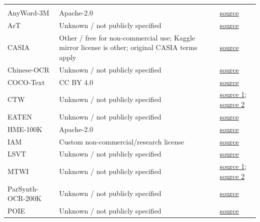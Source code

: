 \begin{longtable}{@{}>{\raggedright\arraybackslash}p{}>{\raggedright\arraybackslash}p{}>{\raggedright\arraybackslash}p{}@{}}
\midrule
{} \\
AnyWord-3M & Apache-2.0 & \href{https://huggingface.co/datasets/stzhao/AnyWord-3M}{source} \\
ArT & Unknown / not publicly specified & \href{https://drive.google.com/file/d/1BH6H75V-vW8G74ih9AXcsiucpqv4eshu/view}{source} \\
CASIA & Other / free for non-commercial use; Kaggle mirror license is other; original CASIA terms apply & \href{https://www.kaggle.com/datasets/pascalbliem/handwritten-chinese-character-hanzi-datasets}{source} \\
Chinese-OCR & Unknown / not publicly specified & \href{https://drive.google.com/file/d/1pM2F04X3itsGi3n-8d7Ppxg6MFqBLKbX/view?usp=sharing}{source} \\
COCO-Text & CC BY 4.0 & \href{https://github.com/bgshih/cocotext/releases/download/dl/cocotext.v2.zip}{source} \\
CTW & Unknown / not publicly specified & \href{https://cloud.tsinghua.edu.cn/d/6f1cfc516c324f41a07b/files/?p=\%2Fctw-public\%2Fctw-annotations.tar.gz&dl=1}{source 1}; \href{https://cloud.tsinghua.edu.cn/d/6f1cfc516c324f41a07b/files/?p=\%2Fctw-public\%2Fimages-trainval\%2Fctw-trainval-*-of-26.tar&dl=1}{source 2} \\
EATEN & Unknown / not publicly specified & \href{https://drive.google.com/file/d/10QPeNGbsCzUOdxESuiA6CROHVx2AkITb/view?usp=sharing}{source} \\
HME-100K & Apache-2.0 & \href{https://huggingface.co/datasets/lmms-lab/LLaVA-OneVision-Data/tree/main/hme100k}{source} \\
IAM & Custom non-commercial/research license & \href{https://huggingface.co/datasets/alpayariyak/IAM_Sentences}{source} \\
LSVT & Unknown / not publicly specified & \href{https://drive.google.com/file/d/18c4u7W_dDacJhe-mABYjleX3CekHb6lN/view}{source} \\
MTWI & Unknown / not publicly specified & \href{https://drive.google.com/file/d/1DDVa81xldAAy9iSAggvNvAIXhCVyBnQo/view?usp=drive_link}{source 1}; \href{https://drive.google.com/file/d/1MNZ3lVZzj6oXBkMKLRb_qdBenWF1s5ew/view?usp=drive_link}{source 2} \\
ParSynth-OCR-200K & Unknown / not publicly specified & \href{https://huggingface.co/datasets/hezarai/parsynth-ocr-200k}{source} \\
POIE & Unknown / not publicly specified & \href{https://drive.google.com/file/d/1eEMNiVeLlD-b08XW_GfAGfPmmII-GDYs/view}{source} \\

\end{longtable}
